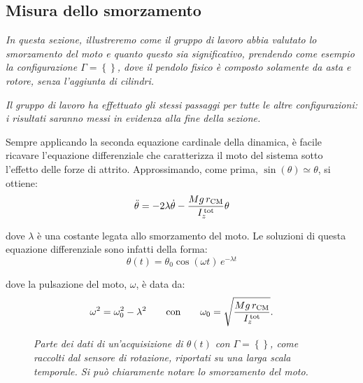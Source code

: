 \documentclass{article}
\begin{document}
\pagebreak
\subsection{Misura dello smorzamento}

\emph{
  In questa sezione, illustreremo come il gruppo di lavoro abbia
  valutato lo smorzamento del moto e quanto questo sia significativo,
  prendendo come esempio la configurazione $\Gamma=\left\{\right\}$,
  dove il pendolo fisico è composto solamente da asta e rotore, senza
  l'aggiunta di cilindri.
}

\emph{
  Il gruppo di lavoro ha effettuato gli stessi passaggi per tutte le
  altre configurazioni: i risultati saranno messi in evidenza alla
  fine della sezione.
}
\vspace{2mm}

Sempre applicando la seconda equazione cardinale della dinamica,
è facile ricavare l'equazione differenziale che caratterizza il moto
del sistema sotto l'effetto delle forze di attrito.
Approssimando, come prima, $\sin(\theta)\simeq\theta$, si ottiene:
\[ \ddot{\theta} = -2\lambda\dot{\theta} -\frac{Mg\,r_\text{CM}}{I_z^\text{\,tot}} \theta \]

dove $\lambda$ è una costante legata allo smorzamento del moto.
Le soluzioni di questa equazione differenziale sono infatti della forma:
\[\theta(t) = \theta_0\cos(\omega t)\,e^{-\lambda t}\]

dove la pulsazione del moto, $\omega$, è data da:
\[
  \omega^2 = \omega_0^2 - \lambda^2
  \qquad\text{con}\qquad
  \omega_0 = \sqrt{\frac{Mg\,r_\text{CM}}{I_z^\text{\,tot}}}.
\]

\begin{center}
  \begin{figure}[H]
    \caption[]{\emph{
      Parte dei dati di un'acquisizione di $\theta(t)$
      con $\Gamma=\left\{\right\}$,
      come raccolti dal sensore di rotazione,
      riportati su una larga scala temporale.
      Si può chiaramente notare lo smorzamento
      del moto.
    }}
  \end{figure}
\end{center}
\end{document}
